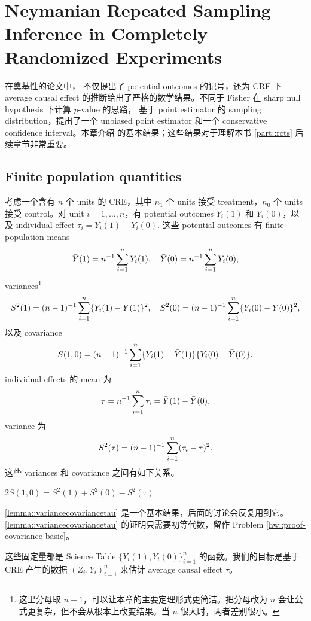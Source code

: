 \chapter{Neymanian Repeated Sampling Inference in Completely Randomized Experiments}\label{chapter::neyman-cr}


在奠基性的论文中，\citet{Neyman:1923} 不仅提出了 potential outcomes 的记号，还为 CRE 下 average causal effect 的推断给出了严格的数学结果。不同于 Fisher 在 sharp null hypothesis 下计算 $p$-value 的思路，\citet{Neyman:1923} 基于 point estimator 的 sampling distribution，提出了一个 unbiased point estimator 和一个 conservative confidence interval。本章介绍 \citet{Neyman:1923} 的基本结果；这些结果对于理解本书 \cref{part::rcts} 后续章节非常重要。



\section{Finite population quantities}

考虑一个含有 $n$ 个 units 的 CRE，其中 $n_1$ 个 units 接受 treatment，$n_0$ 个 units 接受 control。对 unit $i = 1, \ldots, n$，有 potential outcomes $Y_i(1)$ 和 $Y_i(0)$，以及 individual effect $\tau_i = Y_i(1) - Y_i(0).$ 这些 potential outcomes 有 finite population means
$$
\bar{Y}(1) = n^{-1} \sum_{i=1}^n Y_i(1),\quad
\bar{Y}(0) = n^{-1} \sum_{i=1}^n Y_i(0),
$$
variances\footnote{这里分母取 $n-1$，可以让本章的主要定理形式更简洁。把分母改为 $n$ 会让公式更复杂，但不会从根本上改变结果。当 $n$ 很大时，两者差别很小。}
$$
S^2(1) = (n-1)^{-1} \sum_{i=1}^n \{ Y_i(1) -\bar{Y}(1)  \}^2,\quad
S^2(0) = (n-1)^{-1} \sum_{i=1}^n \{ Y_i(0) -\bar{Y}(0)  \}^2 ,
$$
以及 covariance
$$
S(1,0) = (n-1)^{-1} \sum_{i=1}^n \{ Y_i(1) -\bar{Y}(1)  \}\{ Y_i(0) -\bar{Y}(0)  \} .
$$
individual effects 的 mean 为
$$
\tau = n^{-1} \sum_{i=1}^n \tau_i = \bar{Y}(1) - \bar{Y}(0) .
$$
variance 为
$$
S^2(\tau) = (n-1)^{-1} \sum_{i=1}^n (\tau_i - \tau)^2.
$$
这些 variances 和 covariance 之间有如下关系。
\begin{lemma}\label{lemma::variancecovariancetau}
$2S(1,0) = S^2(1)+S^2(0) - S^2(\tau).$
\end{lemma}

\cref{lemma::variancecovariancetau} 是一个基本结果，后面的讨论会反复用到它。\cref{lemma::variancecovariancetau} 的证明只需要初等代数，留作 Problem \ref{hw::proof-covariance-basic}。

这些固定量都是 Science Table $\{ Y_i(1), Y_i(0)  \}_{i=1}^n$ 的函数。我们的目标是基于 CRE 产生的数据 $ (Z_i, Y_i)_{i=1}^n$ 来估计 average causal effect $\tau$。


